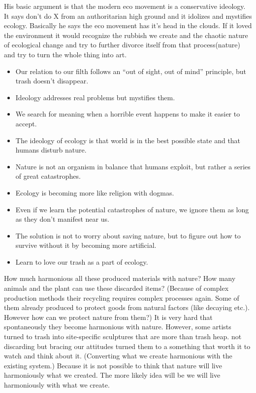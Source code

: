His basic argument is that the modern eco movement is a conservative ideology. It says don't do X from an authoritarian high ground and it idolizes and mystifies ecology. Basically he says the eco movement has it's head in the clouds. If it loved the environment it would recognize the rubbish we create and the chaotic nature of ecological change and try to further divorce itself from that process(nature) and try to turn the whole thing into art. 

\begin{itemize}
\item Our relation to our filth follows an “out of sight, out of mind” principle, but trash doesn’t disappear.
\item Ideology addresses real problems but mystifies them.
\item We search for meaning when a horrible event happens to make it easier to accept.
\item The ideology of ecology is that world is in the best possible state and that humans disturb nature.
\item Nature is not an organism in balance that humans exploit, but rather a series of great catastrophes.
\item Ecology is becoming more like religion with dogmas.
\item Even if we learn the potential catastrophes of nature, we ignore them as long as they don’t manifest near us.
\item The solution is not to worry about saving nature, but to figure out how to survive without it by becoming more artificial.
\item Learn to love our trash as a part of ecology.
\end{itemize}	

How much harmonious all these produced materials with nature? How many animals and the plant can use these discarded items? (Because of complex production methods their recycling requires complex processes again. Some of them already produced to protect goods from natural factors (like decaying etc.). However how can we protect nature from them?) It is very hard that spontaneously they become harmonious with nature. However, some artists turned to trash into site-specific sculptures that are more than trash heap. not discarding but bracing our attitudes turned them to a something that worth it to watch and think about it. (Converting what we create harmonious with the existing system.) Because it is not possible to think that nature will live harmoniously what we created. The more likely idea will be we will live harmoniously with what we create.

